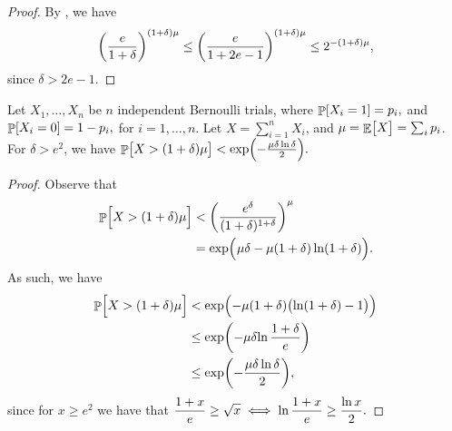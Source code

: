 \begin{proof}
    By , we have
    \begin{align*}
      \pth{\frac{e}{1+\delta}}^{(1+\delta)\mu}%
      \leq%
      \pth{\frac{e}{1+2e - 1}}^{(1+\delta)\mu}%
      \leq%
      2^{-(1+\delta)\mu},
    \end{align*}
    since $\delta > 2e - 1$.
\end{proof}

\begin{lemma}
    Let $X_1, \ldots, X_n$ be $n$ independent Bernoulli trials, where
    \begin{math}
        \Prob{  X_i = 1 } =p_i,
    \end{math}
    and
    \begin{math}
        \Prob{  X_i = 0 } =1- p_i,
    \end{math}
    for $i=1,\ldots, n$.  Let $X = \sum_{i=1}^{n} X_i$, and
    $\mu = \mathop{\mathbb{E}}\!\left[ {\bigl. X} \right] = \sum_i p_i$.  For $\delta > e^2$, we have
    \begin{math}
        \Prob{ \bigl. X > (1+\delta)\mu }%
        <%
        \exp \pth{ \Bigl. - \frac{\mu \delta \ln \delta}{2}}.
    \end{math}
\end{lemma}
\begin{proof}
    Observe that
    \begin{align}
        \Prob{\Bigl. X > (1+\delta)\mu }%
        &<%
        \pth{ \frac{e^\delta}{(1+\delta)^{1+\delta}}}^\mu \nonumber \\
        &=%
        \exp \pth{ \Bigl.\ts \mu \delta - \mu\pth{1+\delta}\ln \pth{
              1+\delta}}.
        \eqlab{c:imply}
    \end{align}
    As such, we have
    \begin{align*}
        \Prob{\Bigl. X > (1+\delta)\mu }%
        &<%
        \exp \pth{ \Bigl. - \mu\pth{1+\delta} \pth{ \bigl. \ln \pth{
                 1+\delta} - 1 }} \\
        &\leq %
        \exp \pth{ \Bigl. - \mu \delta { \bigl. \ln {
                 \frac{1+\delta}{e}} }}%
        \\&%
        \leq %
        \exp \pth{ \Bigl. - \frac{\mu \delta \ln \delta}{2}},
    \end{align*}
    since for $x \geq e^2$ we have that
    \begin{math}
        \ds%
        \frac{1+x}{e} \geq \sqrt{x} \iff%
        \ln \frac{1+x}{e} \geq \frac{\ln{x}}{2}.
    \end{math}
\end{proof}


